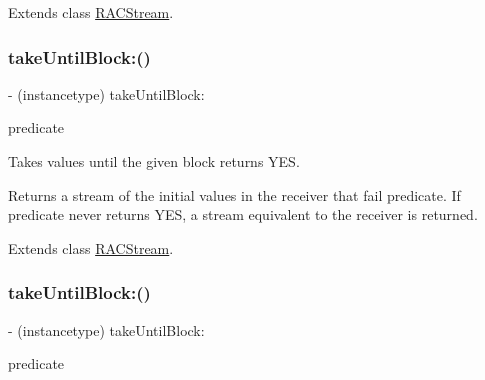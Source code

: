 Extends class \mbox{\hyperlink{interface_r_a_c_stream_af0264b38dc4acd9334d2e42b1ce21b05}{R\+A\+C\+Stream}}.

\mbox{\label{category_r_a_c_stream_07_operations_08_ac19d57150840e93112646eef310c2489}} 
\subsubsection{\texorpdfstring{take\+Until\+Block\+:()}{takeUntilBlock:()}\hspace{0.1cm}{\footnotesize\ttfamily [1/3]}}
{\footnotesize\ttfamily -\/ (instancetype) take\+Until\+Block\+: \begin{DoxyParamCaption}\item[{(B\+O\+OL($^\wedge$)(id x))}]{predicate }\end{DoxyParamCaption}}

Takes values until the given block returns {\ttfamily Y\+ES}.

Returns a stream of the initial values in the receiver that fail {\ttfamily predicate}. If {\ttfamily predicate} never returns {\ttfamily Y\+ES}, a stream equivalent to the receiver is returned. 

Extends class \mbox{\hyperlink{interface_r_a_c_stream_ac19d57150840e93112646eef310c2489}{R\+A\+C\+Stream}}.

\mbox{\label{category_r_a_c_stream_07_operations_08_ac19d57150840e93112646eef310c2489}} 
\subsubsection{\texorpdfstring{take\+Until\+Block\+:()}{takeUntilBlock:()}\hspace{0.1cm}{\footnotesize\ttfamily [2/3]}}
{\footnotesize\ttfamily -\/ (instancetype) take\+Until\+Block\+: \begin{DoxyParamCaption}\item[{(B\+O\+OL($^\wedge$)(id x))}]{predicate }\end{DoxyParamCaption}}

